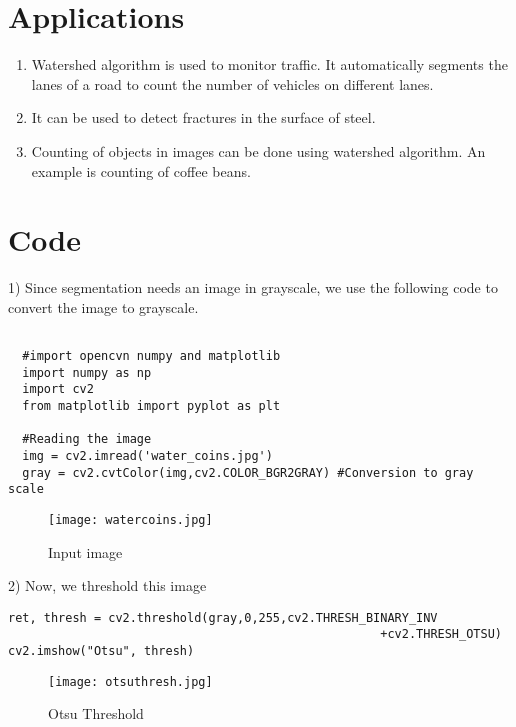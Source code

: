 \documentclass[]{article}
\begin{document}
\section{Applications}\label{additional-resources}

\begin{enumerate}
	\item Watershed algorithm is used to monitor traffic. It automatically segments the lanes of a road to count the number of vehicles on different lanes.
	\item It can be used to detect fractures in the surface of steel.
	\item Counting of objects in images can be done using watershed algorithm. An example is counting of coffee beans.
\end{enumerate}
\newpage
\section{Code}\label{code}

1) Since segmentation needs an image in grayscale, we use the following code to convert the image to grayscale.

\begin{verbatim}

  #import opencvn numpy and matplotlib
  import numpy as np               
  import cv2
  from matplotlib import pyplot as plt
 
  #Reading the image
  img = cv2.imread('water_coins.jpg')
  gray = cv2.cvtColor(img,cv2.COLOR_BGR2GRAY) #Conversion to gray scale
\end{verbatim}
\begin{figure}[h]
	\centering
	\texttt{[image: watercoins.jpg]}
	\caption{Input image}
\end{figure}



2) Now, we threshold this image
\begin{verbatim}
ret, thresh = cv2.threshold(gray,0,255,cv2.THRESH_BINARY_INV 
                                                    +cv2.THRESH_OTSU)   
cv2.imshow("Otsu", thresh)
\end{verbatim}
\begin{figure}[h]
	\centering
	\texttt{[image: otsuthresh.jpg]}
	\caption{Otsu Threshold}
\end{figure}
\end{document}
